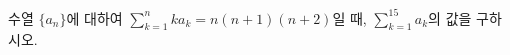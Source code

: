 수열 $\{a_n\}$에 대하여 $\displaystyle\sum_{k=1}^{n} ka_k=n(n+1)(n+2)$일 때, $\displaystyle\sum_{k=1}^{15} a_k$의 값을 구하시오.
